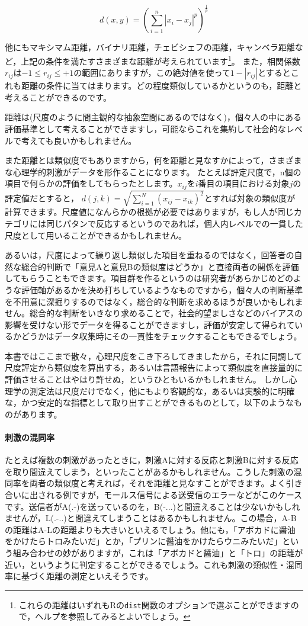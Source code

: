 \documentclass{ltjsbook}
\begin{document}
\[ d(x,y) = \left( \sum_{i=1}^n |x_i - x_j|^p\right)^{\frac{1}{p}} \]


他にもマキシマム距離，バイナリ距離，チェビシェフの距離，キャンベラ距離など，上記の条件を満たすさまざまな距離が考えられています\footnote{これらの距離はいずれもRの\texttt{dist}関数のオプションで選ぶことができますので，ヘルプを参照してみるとよいでしょう。}。
また，相関係数$r_{ij}$は$-1 \le r_{ij} \le +1$の範囲にありますが，この絶対値を使って$1-|r_{ij}|$とするとこれも距離の条件に当てはまります。どの程度類似しているかというのも，距離と考えることができるのです。

距離は(尺度のように間主観的な抽象空間にあるのではなく)，個々人の中にある評価基準として考えることができますし，可能ならこれを集約して社会的なレベルで考えても良いかもしれません。

また距離とは類似度でもありますから，何を距離と見なすかによって，さまざまな心理学的刺激がデータを形作ることになります。
たとえば評定尺度で，n個の項目で何らかの評価をしてもらったとします。$x_{ij}$を$i$番目の項目における対象$j$の評定値だとすると，
$d(j,k) = \sqrt{\sum_{i=1}^N (x_{ij}-x_{ik})^2 }$とすれば対象の類似度が計算できます。尺度値になんらかの根拠が必要ではありますが，もし人が同じカテゴリには同じパタンで反応するというのであれば，個人内レベルでの一貫した尺度として用いることができるかもしれません。

あるいは，尺度によって繰り返し類似した項目を重ねるのではなく，回答者の自然な総合的判断で「意見Aと意見Bの類似度はどうか」と直接両者の関係を評価してもらうこともできます。項目群を作るというのは研究者があらかじめどのような評価軸があるかを決め打ちしているようなものですから，個々人の判断基準を不用意に深掘りするのではなく，総合的な判断を求めるほうが良いかもしれません。総合的な判断をいきなり求めることで，社会的望ましさなどのバイアスの影響を受けない形でデータを得ることができますし，評価が安定して得られているかどうかはデータ収集時にその一貫性をチェックすることもできるでしょう。

本書ではここまで散々，心理尺度をこき下ろしてきましたから，それに同調して尺度評定から類似度を算出する，あるいは言語報告によって類似度を直接量的に評価させることはやはり許せぬ，というひともいるかもしれません。
しかし心理学の測定法は尺度だけでなく，他にもより客観的な，あるいは実験的に明確な，かつ安定的な指標として取り出すことができるものとして，以下のようなものがあります\citep{Takane198002}。

\paragraph{刺激の混同率}たとえば複数の刺激があったときに，刺激Aに対する反応と刺激Bに対する反応を取り間違えてしまう，といったことがあるかもしれません。こうした刺激の混同率を両者の類似度と考えれば，それを距離と見なすことができます。よく引き合いに出される例ですが，モールス信号による送受信のエラーなどがこのケースです。送信者がA(.-)を送っているのを，B(-...)と間違えることは少ないかもしれませんが，L(.-..)と間違えてしまうことはあるかもしれません。この場合，A-Bの距離はA-Lの距離よりも大きいといえるでしょう。他にも，「アボカドに醤油をかけたらトロみたいだ」とか，「プリンに醤油をかけたらウニみたいだ」という組み合わせの妙がありますが，これは「アボカドと醤油」と「トロ」の距離が近い，というように判定することができるでしょう。これも刺激の類似性・混同率に基づく距離の測定といえそうです。
\end{document}
